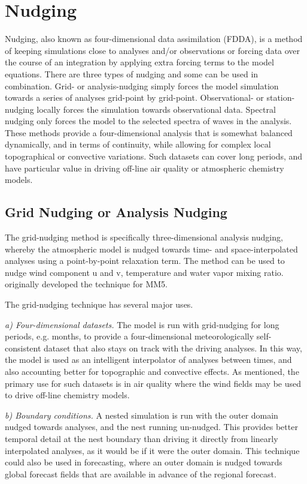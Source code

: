 \chapter{Nudging}
\label{fdda_chap}

Nudging, also known as four-dimensional data assimilation (FDDA), is a method of keeping
simulations close to analyses and/or observations or forcing data over the course of an
integration by applying extra forcing terms to the model equations.
There are three types of nudging and some can be used in
combination. Grid- or analysis-nudging simply forces the model simulation 
towards a series of analyses grid-point by grid-point. Observational- or station-nudging
locally forces the simulation towards observational data. 
Spectral nudging only forces the model to the selected spectra of waves in the analysis.
These methods provide a four-dimensional analysis that is somewhat balanced dynamically,
and in terms of continuity,
while allowing for complex local topographical or convective variations.
Such datasets can cover long periods, and have particular value in driving
off-line air quality or atmospheric chemistry models.

\section{Grid Nudging or Analysis Nudging}

The grid-nudging method is specifically three-dimensional analysis nudging, whereby the atmospheric model is nudged towards time- and space-interpolated analyses using a point-by-point relaxation term. The method can be used to nudge wind component u and v, temperature and water vapor mixing ratio. \citet{stauffer90} originally developed the technique for MM5.

The grid-nudging technique has several major uses.

{\it a) Four-dimensional datasets.} The model is run with grid-nudging for long periods, e.g. months, to provide a four-dimensional meteorologically self-consistent dataset that also stays on track with the driving analyses. In this way, the model is used as an intelligent interpolator of analyses between times, and also accounting better for topographic and convective effects. As mentioned, the primary use for such datasets is in air quality where the wind fields may be used to drive off-line chemistry models.

{\it b) Boundary conditions.} A nested simulation is run with the outer domain nudged towards analyses, and the nest running un-nudged. This provides better temporal detail at the nest boundary than driving it directly from linearly interpolated analyses, as it would be if it were the outer domain. This technique could also be used in forecasting, where an outer domain is nudged towards global forecast fields that are available in advance of the regional forecast.

